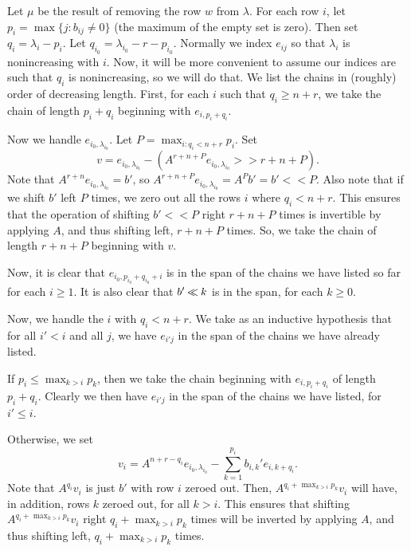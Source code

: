 \documentclass[12pt,psamsfonts]{article}
\newcommand{\leftshift}{\mathbin{\rotatebox[origin=c]{0}{$\ll$}}}
\begin{document}
\par Let \(\mu\) be the result of removing the row \(w\) from \(\lambda\).
For each row \(i\), let \(p_i = \max\{j : b_{ij} \neq 0\}\) (the maximum of the empty set is zero).
Then set \(q_i = \lambda_i - p_i\).  Let \(q_{i_0} = \lambda_{i_0} - r - p_{i_0}\).
Normally we index \(e_{ij}\) so that \(\lambda_i\) is nonincreasing with \(i\).
Now, it will be more convenient to assume our indices are such that \(q_i\) is nonincreasing, so we will do that.
We list the chains in (roughly) order of decreasing length.
First, for each \(i\) such that \(q_i \geq n + r\), we take the chain of length \(p_i + q_i\) beginning with \(e_{i, p_i + q_i}\).
\par Now we handle \(e_{i_0, \lambda_{i_0}}\).
Let \(P = \max_{i : q_i < n + r} p_i\).
Set 
\[v = e_{i_0, \lambda_{i_0}} - (A^{r + n + P}e_{i_0, \lambda_{i_0}} >> r + n + P).\]
Note that \(A^{r + n} e_{i_0, \lambda_{i_0}} = b'\), so \(A^{r + n + P} e_{i_0, \lambda_{i_0}} = A^P b' = b' << P\).
Also note that if we shift \(b'\) left \(P\) times, we zero out all the rows \(i\) where \(q_i < n + r\).
This ensures that the operation of shifting \(b' << P\) right \(r + n + P\) times is invertible by applying \(A\), and thus shifting left, \(r + n + P\) times.
So, we take the chain of length \(r + n + P\) beginning with \(v\).
\par Now, it is clear that \(e_{i_0, p_{i_0} + q_{i_0} + i}\) is in the span of the chains we have listed so far for each \(i \geq 1\).
It is also clear that \(b' \leftshift k\) is in the span, for each \(k \geq 0\).
\par Now, we handle the \(i\) with \(q_i < n + r\).
We take as an inductive hypothesis that for all \(i' < i\) and all \(j\), we have \(e_{i'j}\) in the span of the chains we have already listed.
\par If \(p_i \leq \max_{k > i} p_k\), then we take the chain beginning with \(e_{i,p_i + q_i}\) of length \(p_i + q_i\).
Clearly we then have \(e_{i'j}\) in the span of the chains we have listed, for \(i' \leq i\).
\par Otherwise, we set 
\[v_i = A^{n + r - q_i} e_{i_0, \lambda_{i_0}} - \sum_{k = 1}^{p_i}b_{i,k}' e_{i,k + q_i}.\]
Note that \(A^{q_i} v_i\) is just \(b'\) with row \(i\) zeroed out.
Then, \(A^{q_i + \max_{k > i} p_k} v_i\) will have, in addition, rows \(k\) zeroed out, for all \(k > i\).
This ensures that shifting \(A^{q_i + \max_{k > i} p_k} v_i\) right \(q_i + \max_{k > i} p_k\) times will be inverted by applying \(A\), and thus shifting left, \(q_i + \max_{k > i} p_k\) times.
\end{document}
